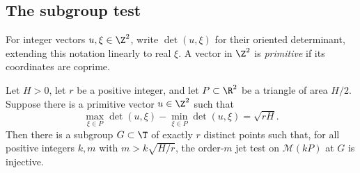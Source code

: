 \subsection{The subgroup test}

For integer vectors $u,\xi\in\Z^2$, write $\det(u,\xi)$ for their
oriented determinant, extending this notation linearly to real $\xi$.
A vector in $\Z^2$ is \emph{primitive} if its coordinates are coprime.

\begin{proposition}\label{prop:subgroup-test}
Let $H>0$, let $r$ be a positive integer, and let $P\subset\R^2$ be a
triangle of area $H/2$.  Suppose there is a primitive vector $u\in\Z^2$
such that
\[
 \max_{\xi\in P}\det(u,\xi)
 -\min_{\xi\in P}\det(u,\xi)=\sqrt{rH}.
\]
Then there is a subgroup $G\subset\T$ of exactly $r$ distinct points
such that, for all positive integers $k,m$ with
$m>k\sqrt{H/r}$, the order-$m$ jet test on $\mathcal M(kP)$ at $G$ is
injective.
\end{proposition}

